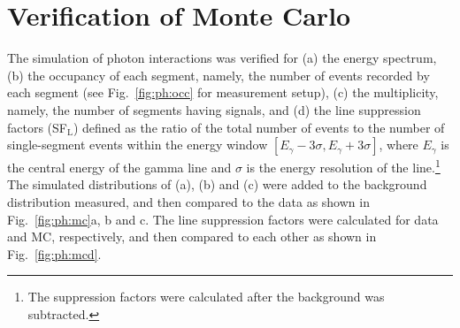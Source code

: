 \section{Verification of Monte Carlo}
\label{sec:ph:var}
The simulation of photon interactions was verified for (a) the energy spectrum, (b) the occupancy of each segment, namely, the number of events recorded by each segment (see Fig.~\ref{fig:ph:occ} for measurement setup), (c) the multiplicity, namely, the number of segments having signals, and (d) the line suppression factors (SF$_{\text{L}}$) defined as the ratio of the total number of events to the number of single-segment events within the energy window $[E_{\gamma} - 3\sigma, E_{\gamma} + 3\sigma]$, where $E_{\gamma}$ is the central energy of the gamma line and $\sigma$ is the energy resolution of the line.\footnote{The suppression factors were calculated after the background was subtracted.} The simulated distributions of (a), (b) and (c) were added to the background distribution measured, and then compared to the data as shown in Fig.~\ref{fig:ph:mc}a, b and c. The line suppression factors were calculated for data and MC, respectively, and then compared to each other as shown in Fig.~\ref{fig:ph:mcd}.

